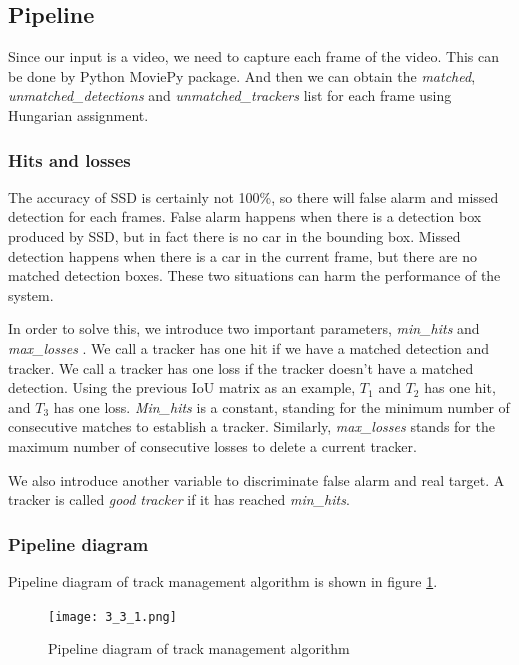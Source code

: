 \documentclass[10pt,twocolumn,letterpaper]{article}
\begin{document}
\subsection{Pipeline}
Since our input is a video, we need to capture each frame of the video. This can be done by Python MoviePy package. And then we can obtain the \emph{matched}, \emph{unmatched\_detections} and \emph{unmatched\_trackers} list for each frame using Hungarian assignment. 

\subsubsection{Hits and losses}
The accuracy of SSD is certainly not 100\%, so there will false alarm and missed detection for each frames. False alarm happens when there is a detection box produced by SSD, but in fact there is no car in the bounding box. Missed detection happens when there is a car in the current frame, but there are no matched detection boxes. These two situations can harm the performance of the system. 

In order to solve this, we introduce two important parameters, \emph{min\_hits} and \emph{max\_losses} . We call a tracker has one hit if we have a matched detection and tracker. We call a tracker has one loss if the tracker doesn’t have a matched detection. Using the previous IoU matrix as an example, $T_1$ and $T_2$ has one hit, and $T_3$ has one loss. \emph{Min\_hits} is a constant, standing for the minimum number of consecutive matches to establish a tracker. Similarly, \emph{max\_losses} stands for the maximum number of consecutive losses to delete a current tracker. 

We also introduce another variable to discriminate false alarm and real target. A tracker is called \emph{good tracker} if it has reached \emph{min\_hits}.

\subsubsection{Pipeline diagram}
Pipeline diagram of track management algorithm is shown in figure \ref{fig:3_3_1}.

\begin{figure}[t]
\begin{center}
   \texttt{[image: 3\_3\_1.png]}
\end{center}
   \caption{Pipeline diagram of track management algorithm}
\label{fig:3_3_1}
\end{figure}
\end{document}
